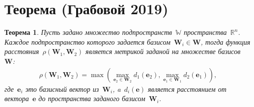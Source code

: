 \documentclass[12pt, twoside]{article}
\newtheorem{theorem}{Теорема}
\numberwithin{equation}{section}
\begin{document}
\section{Теорема (Грабовой 2019)}\label{ProofTheorem1}
\begin{theorem}\label{th:1} 
Пусть задано множество подпространств~$\mathbb{W}$ пространства~$\mathbb{R}^{n}$. Каждое подпространство которого задается базисом~$\mathbf{W}_i\in \mathbf{W}$, тогда функция расстояния~$\rho\left(\textbf{W}_1, \textbf{W}_2\right)$ является метрикой заданой на множестве базисов~$\mathbf{W}$:
\begin{equation}
\begin{aligned}
\rho\left(\textbf{W}_1, \textbf{W}_2\right) = \max\left(\max_{\textbf{e}_2 \in \textbf{W}_2} d_{1}\left(\textbf{e}_2\right), \max_{\textbf{e}_1 \in \textbf{W}_1} d_{2}\left(\textbf{e}_1\right)\right),
\end{aligned}
\end{equation}
где~$\textbf{e}_i$ это базисный вектор из~$\textbf{W}_i$, a~$d_i\left(\textbf{e}\right)$ является расстоянием от вектора~$\textbf{e}$ до пространства заданого базисом~$\textbf{W}_i$.
\end{theorem}
\end{document}

